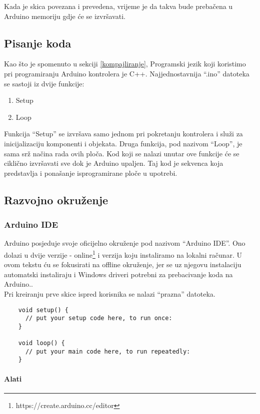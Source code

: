 \documentclass[../Document.tex]{subfiles}
\begin{document}
Kada je skica povezana i prevedena, vrijeme je da takva bude prebačena u Arduino memoriju gdje će se izvršavati.

\subsection{Pisanje koda}
Kao što je spomenuto u sekciji \ref{kompajliranje}, Programski jezik koji koristimo pri programiranju Arduino kontrolera je C++. Najjednostavnija ``.ino'' datoteka se sastoji iz dvije funkcije:

\begin{enumerate}
  \item Setup
  \item Loop
\end{enumerate}

Funkcija ``Setup'' se izvršava samo jednom pri pokretanju kontrolera i služi za inicijalizaciju komponenti i objekata. Druga funkcija, pod nazivom ``Loop'', je sama srž načina rada ovih ploča. Kod koji se nalazi unutar ove funkcije će se ciklično izvršavati sve dok je Arduino upaljen. Taj kod je sekvenca koja predstavlja i ponašanje isprogramirane ploče u upotrebi.

\subsection{Razvojno okruženje}
\subsubsection{Arduino IDE}
Arduino posjeduje svoje oficijelno okruženje pod nazivom ``Arduino IDE''. Ono dolazi u dvije verzije - online\footnote{https://create.arduino.cc/editor} i verzija koju instaliramo na lokalni računar. U ovom tekstu ću se fokusirati na offline okruženje, jer se uz njegovu instalaciju automatski instaliraju i Windows driveri potrebni za prebacivanje koda na Arduino..\\

\noindent Pri kreiranju prve skice ispred korisnika se nalazi ``prazna'' datoteka.

\begin{verbatim}
    void setup() {
      // put your setup code here, to run once:
    }

    void loop() {
      // put your main code here, to run repeatedly:
    }
\end{verbatim}

\paragraph{Alati}
\end{document}
